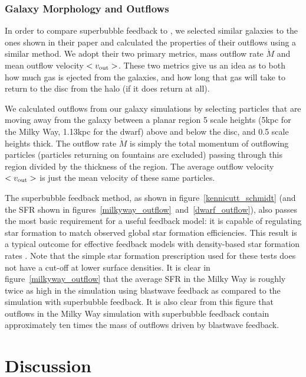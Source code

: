 \subsubsection{Galaxy Morphology and Outflows}\label{Morphology}

In order to compare superbubble feedback to \citet{DallaVecchia2012}, we selected
similar galaxies to the ones shown in their paper and calculated the properties
of their outflows using a similar method.  We adopt their two primary metrics,
mass outflow rate $\dot M$ and mean outflow velocity $<v_{\rm out}>$.  These two
metrics give us an idea as to both how much gas is ejected from the galaxies,
and how long that gas will take to return to the disc from the halo (if it does
return at all).

We calculated outflows from our galaxy simulations by selecting particles that
are moving away from the galaxy between a planar region 5 scale heights (5kpc
for the Milky Way, 1.13kpc for the dwarf) above and below the disc, and 0.5
scale heights thick.  The outflow rate $\dot M$ is simply the total momentum of
outflowing particles (particles returning on fountains are excluded) passing
through this region divided by the thickness of the region.  The average outflow
velocity $<v_{\rm out}>$ is just the mean velocity of these same particles.

The superbubble feedback method, as shown in figure~\ref{kennicutt_schmidt} (and
the SFR shown in figures~\ref{milkyway_outflow}~and~\ref{dwarf_outflow}), also
passes the most basic requirement for a useful feedback model:  it is capable of
regulating star formation to match observed global star formation efficiencies.
This result is a typical outcome for effective feedback models with density-based 
star formation rates \citep[e.g.][]{Springel2003}.
Note that the simple star formation prescription used for
these tests does not have a cut-off at lower surface densities.  It is clear in
figure~\ref{milkyway_outflow} that the average SFR in the Milky Way is roughly
twice as high in the simulation using blastwave feedback as compared to the
simulation with superbubble feedback.  It is also clear from this figure that
outflows in the Milky Way simulation with superbubble feedback contain
approximately ten times the mass of outflows driven by blastwave feedback.

\section{Discussion}

